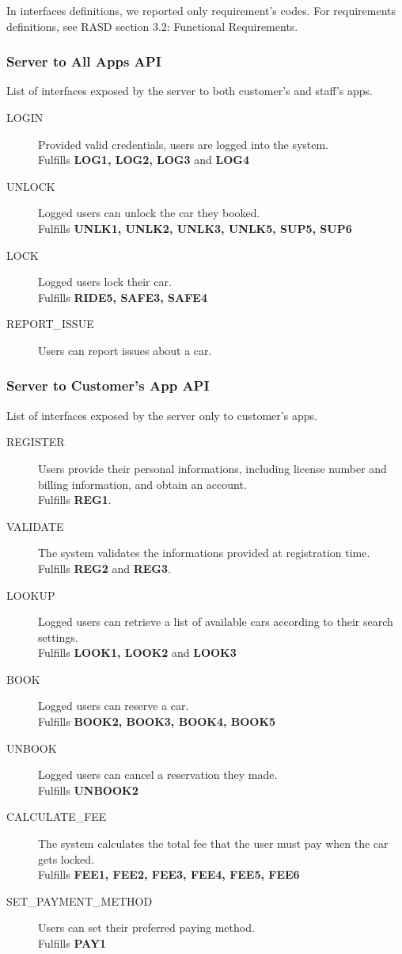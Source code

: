 \documentclass[11pt]{article} %
\begin{document}
In interfaces definitions, we reported only requirement's codes. For requirements definitions, see RASD section 3.2: Functional Requirements.

\subsubsection{Server to All Apps API }
List of interfaces exposed by the server to both customer's and staff's apps.
\begin{description}
	\item[LOGIN] Provided valid credentials, users are logged into the system. \\ Fulfills \textbf{LOG1, LOG2, LOG3} and \textbf{LOG4}
	\item[UNLOCK] Logged users can unlock the car they booked. \\ Fulfills \textbf{UNLK1, UNLK2, UNLK3, UNLK5, SUP5, SUP6}	
	\item[LOCK] Logged users lock their car. \\ Fulfills \textbf{RIDE5, SAFE3, SAFE4}
	\item[REPORT\_ISSUE] Users can report issues about a car.  {\color{red}{No matching req. found .-.}}
\end{description}


\subsubsection{Server to Customer's App API}
List of interfaces exposed by the server only to customer's apps.
\begin{description}
	\item[REGISTER] Users provide their personal informations, including license number and billing information, and obtain an account. \\ Fulfills \textbf{REG1}.
	\item[VALIDATE] The system validates the informations provided at registration time. \\ Fulfills \textbf{REG2} and \textbf{REG3}.
	\item[LOOKUP] Logged users can retrieve a list of available cars according to their search settings.\\ Fulfills \textbf{LOOK1, LOOK2} and \textbf{LOOK3} 
	\item[BOOK] Logged users can reserve a car. \\ Fulfills \textbf{BOOK2, BOOK3, BOOK4, BOOK5 }	
	\item[UNBOOK] Logged users can cancel a reservation they made. \\ Fulfills \textbf{UNBOOK2}	
	\item[CALCULATE\_FEE] The system calculates the total fee that the user must pay when the car gets locked. \\ Fulfills \textbf{FEE1, FEE2, FEE3, FEE4, FEE5, FEE6}	
	\item[SET\_PAYMENT\_METHOD] Users can set their preferred paying method. \\ Fulfills \textbf{PAY1}
\end{description}
\end{document}
